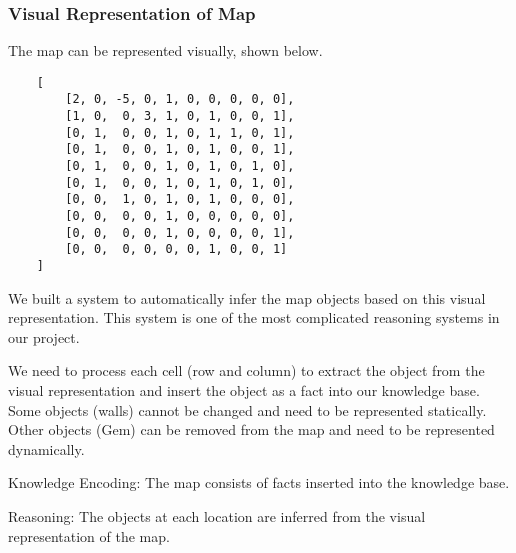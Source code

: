 \documentclass[10pt]{article}
\begin{document}
\subsubsection*{Visual Representation of Map}

The map can be represented visually, shown below.

\begin{verbatim}
    [
        [2, 0, -5, 0, 1, 0, 0, 0, 0, 0],
        [1, 0,  0, 3, 1, 0, 1, 0, 0, 1],
        [0, 1,  0, 0, 1, 0, 1, 1, 0, 1],
        [0, 1,  0, 0, 1, 0, 1, 0, 0, 1],
        [0, 1,  0, 0, 1, 0, 1, 0, 1, 0],
        [0, 1,  0, 0, 1, 0, 1, 0, 1, 0],
        [0, 0,  1, 0, 1, 0, 1, 0, 0, 0],
        [0, 0,  0, 0, 1, 0, 0, 0, 0, 0],
        [0, 0,  0, 0, 1, 0, 0, 0, 0, 1],
        [0, 0,  0, 0, 0, 0, 1, 0, 0, 1]
    ]
\end{verbatim}

We built a system to automatically infer the map objects based on this visual representation. This system is one of the most complicated reasoning systems in our project.

We need to process each cell (row and column) to extract the object from the visual representation and insert the object as a fact into our knowledge base. Some objects (walls) cannot be changed and need to be represented statically. Other objects (Gem) can be removed from the map and need to be represented dynamically.

Knowledge Encoding: The map consists of facts inserted into the knowledge base.

Reasoning: The objects at each location are inferred from the visual representation of the map.




\end{document}

